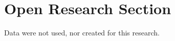\documentclass[draft]{agujournal2019}
\begin{document}






%
%

\section*{Open Research Section}
Data were not used, nor created for this research.
\end{document}
